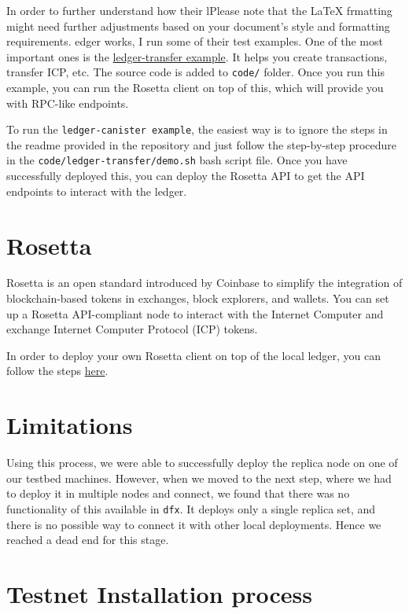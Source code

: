 In order to further understand how their lPlease note that the LaTeX frmatting might need further adjustments based on your 
document's style and formatting requirements.
edger works, I run some of their test examples. One of the most important ones is the \href{https://github.com/dfinity/examples/tree/master/motoko/ledger-transfer}{ledger-transfer example}. It helps you create transactions, transfer ICP, etc. The source 
code is added to \texttt{code/} folder. Once you run this example, you can run the Rosetta client on top of this, which will 
provide you with RPC-like endpoints.

To run the \texttt{ledger-canister example}, the easiest way is to ignore the steps in the readme provided in the repository and 
just follow the step-by-step procedure in the \texttt{code/ledger-transfer/demo.sh} bash script file. Once you have successfully 
deployed this, you can deploy the Rosetta API to get the API endpoints to interact with the ledger.

\section{Rosetta}

Rosetta is an open standard introduced by Coinbase to simplify the integration of blockchain-based tokens in exchanges, block 
explorers, and wallets. You can set up a Rosetta API-compliant node to interact with the Internet Computer and exchange Internet 
Computer Protocol (ICP) tokens.

In order to deploy your own Rosetta client on top of the local ledger, you can follow the steps \href{https://internetcomputer.org/docs/current/developer-docs/integrations/rosetta/}{here}.

\section{Limitations}

Using this process, we were able to successfully deploy the replica node on one of our testbed machines. However, when we moved 
to the next step, where we had to deploy it in multiple nodes and connect, we found that there was no functionality of this 
available in \texttt{dfx}. It deploys only a single replica set, and there is no possible way to connect it with other local 
deployments. Hence we reached a dead end for this stage.

\section{Testnet Installation process}

